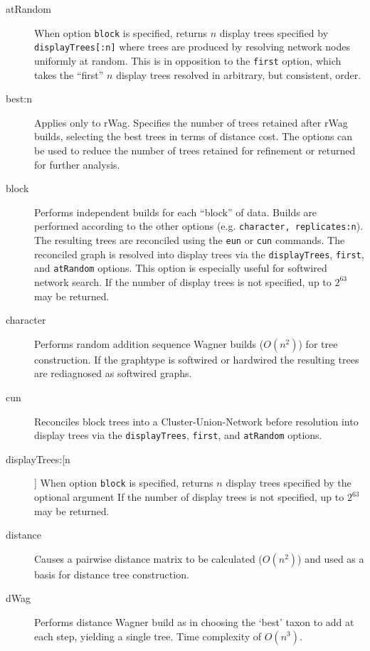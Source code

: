 	\begin{description}
		\item [atRandom] When option \texttt{block} is specified, returns $n$ display trees specified by 
		\texttt{displayTrees[:n]} where trees are produced by resolving network nodes uniformly at random. 
		This is in opposition to the \texttt{first} option, which takes the ``first'' $n$ display trees resolved 
		in arbitrary, but consistent, order.

		\item [best:n] Applies only to rWag. Specifies the number of trees retained after rWag builds, 
		selecting the best trees in terms of distance cost. The options can be used to reduce
		the number of trees retained for refinement or returned for further analysis. 

		\item[block] Performs independent builds for each ``block'' of data. Builds are performed according 
		to the other options (e.g. \texttt{character, replicates:n}). The resulting trees are reconciled using the 
		\texttt{eun} or \texttt{cun} commands. The reconciled graph is resolved into display trees via the 
		\texttt{displayTrees}, \texttt{first}, and \texttt{atRandom} options. This option is especially useful 
		for softwired network search. If the number of display trees is not specified, up to $2^{63}$ may be 
		returned.

		\item [character] Performs random addition sequence Wagner \citep{Farris1970} builds ($O(n^2)$) 
		for tree construction. If the graphtype is softwired or hardwired the resulting trees are rediagnosed 
		as softwired graphs.
		
		\item [cun] Reconciles block trees into a Cluster-Union-Network \citep{Baroni2005} before resolution 
		into display trees via the \texttt{displayTrees}, \texttt{first}, 	and \texttt{atRandom} options.

		\item [displayTrees:[n]] When option \texttt{block} is specified, returns $n$ display trees specified 
		by the optional argument If the number of display trees is not specified, up to $2^{63}$ may be returned.

		\item [distance] Causes a pairwise distance matrix to be calculated ($O(n^2)$) and used as a basis 
		for distance tree construction.
		
		\item [dWag] Performs distance Wagner build as in \citep{Farris1972} choosing the `best' taxon to 
		add at each step, yielding a single tree. Time complexity of $O(n^3)$.
		

\end{description}
